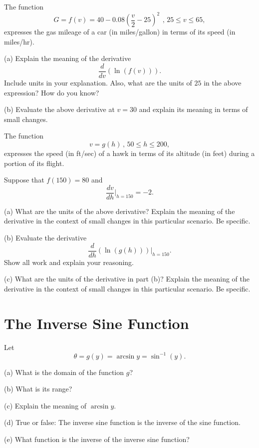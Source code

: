 \documentclass{ximera}
\begin{document}
\begin{question}  \label{Qd654thmm}
The function 
\[ 
      G = f(v) = 40-0.08\left(\frac{v}{2}-25\right)^{2}\, \ , \, 25\leq v\leq 65 ,
\]
expresses the gas mileage of a car (in miles/gallon) in terms of its speed (in miles/hr).

(a) Explain the meaning of the derivative 
\[
     \frac{d}{dv} \left( \ln (f(v)) \right) .
\]
Include units in your explanation. Also, what are the units of $25$ in the above expression? How do you know?

(b) Evaluate the above derivative at $v=30$ and explain its meaning in terms of small changes.

\end{question}


\begin{question}   \label{Qdfdfnnn}
The function
\[
    v =g(h) \, , \, 50\leq h \leq 200 , 
\]
expresses the speed (in ft/sec) of a hawk in terms of its altitude (in feet) during a portion of its flight.

Suppose that $f(150) = 80$ and
\[
     \frac{dv}{dh}\Big|_{h=150} = -2 .
\]

(a) What are the units of the above derivative? Explain the meaning of the derivative in the context of small changes in this particular scenario. Be specific.

(b) Evaluate the derivative
\[
    \frac{d}{dh} \left( \ln (g(h))\right)\Big|_{h=150}.
\]
Show all work and explain your reasoning.

(c) What are the units of the derivative in part (b)? Explain the meaning of the derivative in the context of small changes in this particular scenario. Be specific.

\end{question}


\section*{The Inverse Sine Function}
Let
\[
  \theta = g(y) = \arcsin y = \sin^{-1}(y).
\]

(a) What is the domain of the function $g$?

(b) What is its range?

(c) Explain the meaning of $\arcsin y$.

(d) True or false: The inverse sine function is the inverse of the sine function.

(e) What function is the inverse of the inverse sine function?
\end{document}
